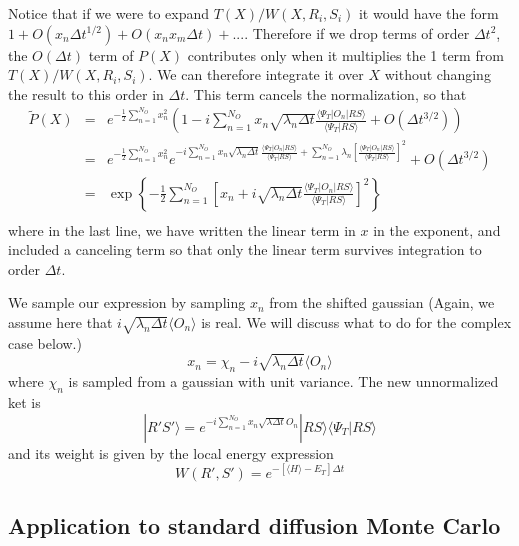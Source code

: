  Notice that if we were to expand $T(X)/W(X,R_i,S_i)$ it would
 have the form $1 + O(x_n\Delta t^{1/2}) + O(x_nx_m \Delta t)+ ...$.
 Therefore if we drop terms of order $\Delta t^2$, the $O(\Delta t)$ term of
 $P(X)$ contributes only when it multiplies the 1 term from $T(X)/W(X,R_i,S_i)$.
 We can therefore integrate it
 over $X$ without changing the result to this
 order in $\Delta t$. This term cancels the normalization, so that
 \begin{eqnarray}
 \tilde P(X) &=&
 e^{-\frac{1}{2} \sum_{n=1}^{N_O} x_n^2}
 \left (1 -i\sum_{n=1}^{N_O} x_n \sqrt{\lambda_n \Delta t}
 \frac{\langle \Psi_T|O_n|R S\rangle}
 {\langle \Psi_T|R S\rangle} + O(\Delta t^{3/2}) \right )
 \nonumber\\
 &=& e^{-\frac{1}{2} \sum_{n=1}^{N_O} x_n^2}
 e^{ -i\sum_{n=1}^{N_O} x_n \sqrt{\lambda_n \Delta t}
 	\frac{\langle \Psi_T|O_n|R S\rangle}{\langle \Psi_T|R S\rangle}
 	+\sum_{n=1}^{N_O} \lambda_n 
 	[\frac{\langle \Psi_T|O_n|R S\rangle}{\langle \Psi_T|R S\rangle}]^2}
 +O(\Delta t^{3/2})
 \nonumber\\
 &=&
 \exp\left \{-\frac{1}{2} \sum_{n=1}^{N_O} 
 \left [x_n+i\sqrt{\lambda_n \Delta t}
 \frac{\langle \Psi_T|O_n|R S\rangle}{\langle \Psi_T|R S\rangle}
 \right ]^2 \right \}
 \nonumber\\
 \label{eq.hsimpexpanded}
 \end{eqnarray}
 where in the last line, we have written the linear term in $x$ in the
 exponent, and included a canceling term so that only
 the linear term survives integration to order $\Delta t$.
 
 We sample our expression by sampling $x_n$ from the shifted gaussian
 (Again, we assume here that
 $i\sqrt{\lambda_n \Delta t}\langle O_n \rangle$ is real.
 We will discuss what to do for the complex case below.)
 \begin{equation}
 x_n = \chi_n -i \sqrt{\lambda_n\Delta t} \langle O_n\rangle
 \end{equation}
 where $\chi_n$ is sampled from a gaussian with unit variance.
 The new unnormalized ket is
 \begin{equation}
 |R'S'\rangle = e^{-i\sum_{n=1}^{N_O} x_n\sqrt{\lambda \Delta t} O_n}
 |RS\rangle \langle \Psi_T |RS\rangle
 \end{equation}
 and its weight is given by the local energy expression
 \begin{equation}
 W(R',S') = e^{-[\langle H \rangle-E_T] \Delta t}
 \end{equation}
 
 \subsection{Application to standard diffusion Monte Carlo}
